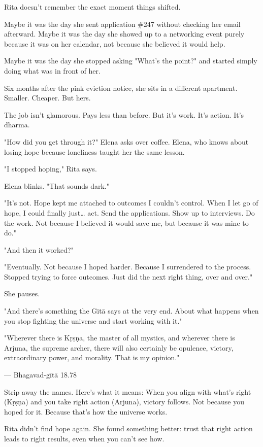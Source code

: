 \documentclass[11pt,twoside]{book}
\begin{document}
Rita doesn't remember the exact moment things shifted.

Maybe it was the day she sent application \#247 without checking her email afterward. Maybe it was the day she showed up to a networking event purely because it was on her calendar, not because she believed it would help.

Maybe it was the day she stopped asking "What's the point?" and started simply doing what was in front of her.

Six months after the pink eviction notice, she sits in a different apartment. Smaller. Cheaper. But hers.

The job isn't glamorous. Pays less than before. But it's work. It's action. It's dharma.

"How did you get through it?" Elena asks over coffee. Elena, who knows about losing hope because loneliness taught her the same lesson.

"I stopped hoping," Rita says.

Elena blinks. "That sounds dark."

"It's not. Hope kept me attached to outcomes I couldn't control. When I let go of hope, I could finally just\ldots{} act. Send the applications. Show up to interviews. Do the work. Not because I believed it would save me, but because it was mine to do."

"And then it worked?"

"Eventually. Not because I hoped harder. Because I surrendered to the process. Stopped trying to force outcomes. Just did the next right thing, over and over."

She pauses.

"And there's something the Gītā says at the very end. About what happens when you stop fighting the universe and start working with it."

\begin{pullquote}
"Wherever there is Kṛṣṇa, the master of all mystics, and wherever there is Arjuna, the supreme archer, there will also certainly be opulence, victory, extraordinary power, and morality. That is my opinion."

--- Bhagavad-gītā 18.78
\end{pullquote}

Strip away the names. Here's what it means: When you align with what's right (Kṛṣṇa) and you take right action (Arjuna), victory follows. Not because you hoped for it. Because that's how the universe works.

Rita didn't find hope again. She found something better: trust that right action leads to right results, even when you can't see how.
\end{document}
